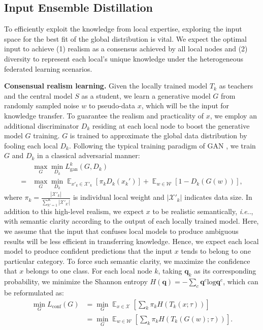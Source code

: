 \documentclass[letterpaper]{article} %
\makeatletter
\DeclareRobustCommand\onedot{\futurelet\@let@token\@onedot}
\def\@onedot{\ifx\@let@token.\else.\null\fi\xspace}
\DeclareMathOperator*{\fe}{\mathbb{E}}
\def\ie{\emph{i.e}\onedot} \def\Ie{\emph{I.e}\onedot}
\newcommand{\domw}{\mathcal{W}}
\newcommand{\domx}{\mathcal{X}}
\makeatother
\begin{document}
\subsection{Input Ensemble Distillation}
 To efficiently exploit the knowledge from local expertise, exploring the input space for the best fit of the global distribution is vital. We expect the optimal input to achieve (1) realism as a consensus achieved by all local nodes and (2) diversity to represent each local's unique knowledge under the heterogeneous federated learning scenarios.

\textbf{Consensual realism learning.}
Given the locally trained model $T_k$ as teachers and the central model $S$ as a student, we learn a generative model $G$ from randomly sampled noise $w$ to pseudo-data $x$, which will be the input for knowledge transfer. To guarantee the realism and practicality of $x$, we employ an additional discriminator $D_k$ residing at each local node to boost the generative model $G$ training.  $G$ is trained to approximate the global data distribution by fooling each local $D_k$. Following the typical training paradigm of GAN \cite{goodfellow2020generative, radford2015unsupervised}, we train $G$ and $D_k$ in a classical adversarial manner:
\begin{equation}
\label{eq:ganloss}
\begin{aligned}
    &\max_G \min_{D_k}L_\text{gan}^k(G, D_k) \\
    = &\max_G \min_{D_k} \fe_{x'_k \in \domx'_k} [\pi_k D_k(x_k')]  +  \fe_{w \in \domw} [1-D_k(G(w))],
\end{aligned}
\end{equation}
where $\pi_k =  \frac{|\domx'_k|}{\sum_{k'=1}^K |\domx'_{k'}|}$ is individual local weight and $|\domx'_k|$ indicates data size. In addition to this high-level realism, we expect $x$ to be realistic semantically, \ie, with semantic clarity according to the output of each locally trained model. Here, we assume that the input that confuses local models to produce ambiguous results will be less efficient in transferring knowledge. Hence, we expect each local model to produce confident predictions that the input $x$ tends to belong to one particular category. To force such semantic clarity, we maximize the confidence that $x$ belongs to one class. For each local node $k$, taking $\bm{q}_k$ as its corresponding probability, we minimize the Shannon entropy $H({\bm{q}})= - \sum_c \bm{q}^c \text{log} \bm{q}^c $, which can be reformulated as:
\begin{equation}
\label{eq:confloss}
\begin{aligned}
    \min_{G} L_\text{conf}(G) &= \min_{G} \fe_{x \in \domx} [\sum_k{ \pi_k H (T_k(x; \tau))}] \\
    & =\min_{G}\fe_{w \in \domw} [\sum_k{\pi_k H (T_k(G(w); \tau))}]. \\
\end{aligned}
\end{equation}
\end{document}
